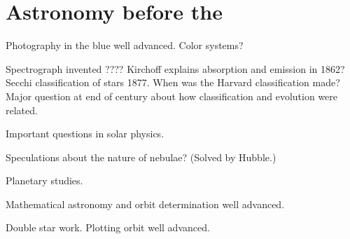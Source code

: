 \chapter{Astronomy before the }

Photography in the blue well advanced. Color systems?

Spectrograph invented ???? Kirchoff explains absorption and emission in 
1862?  Secchi classification of stars 1877.  When was the Harvard classification
made? Major question at end of century about how classification and evolution
were related.

Important questions in solar physics.

Speculations about the nature of nebulae?  (Solved by Hubble.)

Planetary studies.

Mathematical astronomy and orbit determination well advanced.

Double star work.  Plotting orbit well advanced.
